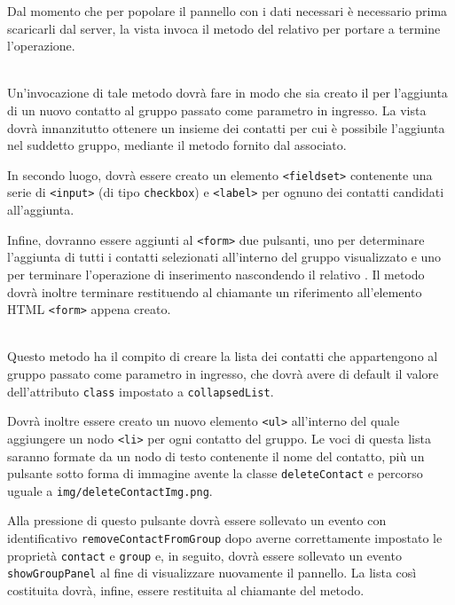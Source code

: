 \begin{description}
  Dal momento che per popolare il pannello con i dati necessari è necessario prima scaricarli dal server, la vista invoca il metodo  del relativo  per portare a termine l'operazione.
  
  \item{}\\
  Un'invocazione di tale metodo dovrà fare in modo che sia creato il  per l'aggiunta di un nuovo contatto al gruppo passato come parametro in ingresso. La vista dovrà innanzitutto ottenere un insieme dei contatti per cui è possibile l'aggiunta nel suddetto gruppo, mediante il metodo  fornito dal  associato.
  
  In secondo luogo, dovrà essere creato un elemento \verb'<fieldset>' contenente una serie di \verb'<input>' (di tipo \verb'checkbox') e \verb'<label>' per ognuno dei contatti candidati all'aggiunta.
  
  Infine, dovranno essere aggiunti al \verb'<form>' due pulsanti, uno per determinare l'aggiunta di tutti i contatti selezionati all'interno del gruppo visualizzato e uno per terminare l'operazione di inserimento nascondendo il relativo . Il metodo dovrà inoltre terminare restituendo al chiamante un riferimento all'elemento HTML \verb'<form>' appena creato.
  
  \item{}\\
  Questo metodo ha il compito di creare la lista dei contatti che appartengono al gruppo passato come parametro in ingresso, che dovrà avere di default il valore dell'attributo \verb'class' impostato a \verb'collapsedList'.
  
  Dovrà inoltre essere creato un nuovo elemento \verb'<ul>' all'interno del quale aggiungere un nodo \verb'<li>' per ogni contatto del gruppo. Le voci di questa lista saranno formate da un nodo di testo contenente il nome del contatto, più un pulsante sotto forma di immagine avente la classe \verb'deleteContact' e percorso uguale a \verb'img/deleteContactImg.png'.
  
  Alla pressione di questo pulsante dovrà essere sollevato un evento con identificativo \verb'removeContactFromGroup' dopo averne correttamente impostato le proprietà \verb'contact' e \verb'group' e, in seguito, dovrà essere sollevato un evento \verb'showGroupPanel' al fine di visualizzare nuovamente il pannello. La lista così costituita dovrà, infine, essere restituita al chiamante del metodo.

\end{description}

